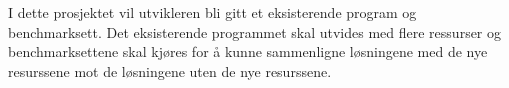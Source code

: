 I dette prosjektet vil utvikleren bli gitt et eksisterende \ilog program og benchmarksett. Det eksisterende \ilog programmet skal utvides med flere ressurser og benchmarksettene skal kjøres for å kunne sammenligne løsningene med de nye resurssene mot de løsningene uten de nye resurssene.